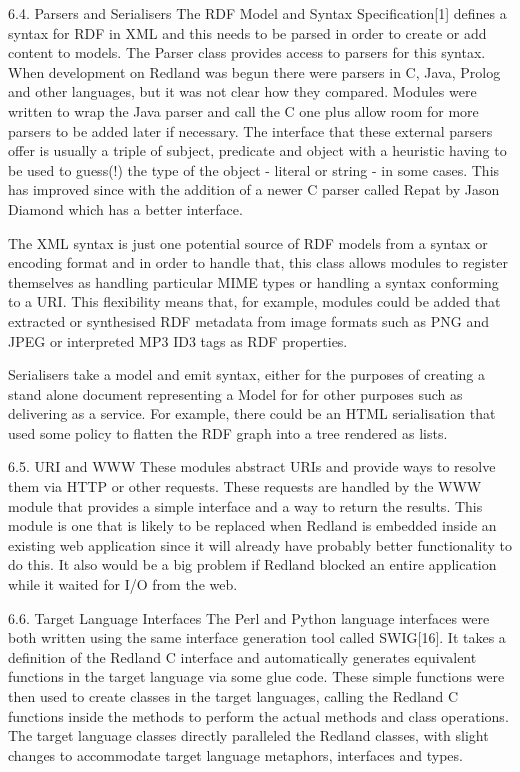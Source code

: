 \documentclass[11pt]{article}
\begin{document}
    6.4. Parsers and Serialisers
    The RDF Model and Syntax Specification[1] defines a syntax for RDF in XML and this needs to be parsed in order to create or add content to models. The Parser class provides access to parsers for this syntax. When development on Redland was begun there were parsers in C, Java, Prolog and other languages, but it was not clear how they compared. Modules were written to wrap the Java parser and call the C one plus allow room for more parsers to be added later if necessary. The interface that these external parsers offer is usually a triple of subject, predicate and object with a heuristic having to be used to guess(!) the type of the object - literal or string - in some cases. This has improved since with the addition of a newer C parser called Repat by Jason Diamond which has a better interface.

    The XML syntax is just one potential source of RDF models from a syntax or encoding format and in order to handle that, this class allows modules to register themselves as handling particular MIME types or handling a syntax conforming to a URI. This flexibility means that, for example, modules could be added that extracted or synthesised RDF metadata from image formats such as PNG and JPEG or interpreted MP3 ID3 tags as RDF properties.

    Serialisers take a model and emit syntax, either for the purposes of creating a stand alone document representing a Model for for other purposes such as delivering as a service. For example, there could be an HTML serialisation that used some policy to flatten the RDF graph into a tree rendered as lists.

    6.5. URI and WWW
    These modules abstract URIs and provide ways to resolve them via HTTP or other requests. These requests are handled by the WWW module that provides a simple interface and a way to return the results. This module is one that is likely to be replaced when Redland is embedded inside an existing web application since it will already have probably better functionality to do this. It also would be a big problem if Redland blocked an entire application while it waited for I/O from the web.

    6.6. Target Language Interfaces
    The Perl and Python language interfaces were both written using the same interface generation tool called SWIG[16]. It takes a definition of the Redland C interface and automatically generates equivalent functions in the target language via some glue code. These simple functions were then used to create classes in the target languages, calling the Redland C functions inside the methods to perform the actual methods and class operations. The target language classes directly paralleled the Redland classes, with slight changes to accommodate target language metaphors, interfaces and types.
\end{document}
